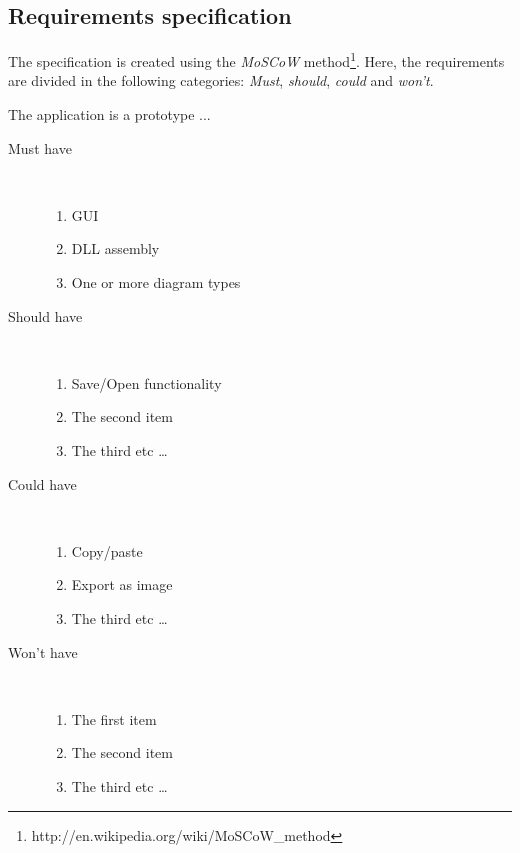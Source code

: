\newpage
\subsection{Requirements specification}
The specification is created using the \textit{MoSCoW} 
method\footnote{http://en.wikipedia.org/wiki/MoSCoW\_method}. Here, the 
requirements 
are divided in the following categories: \textit{Must}, \textit{should}, 
\textit{could} and 
\textit{won't}.

The application is a prototype ...

\begin{description}
	\item[Must have] \hfill \\
	\begin{enumerate}
		\item GUI
		\item DLL assembly
		\item One or more diagram types
	\end{enumerate}
	\item[Should have] \hfill \\
	\begin{enumerate}
		\item Save/Open functionality
		\item The second item
		\item The third etc \ldots
	\end{enumerate}
	\item[Could have] \hfill \\
	\begin{enumerate}
		\item Copy/paste
		\item Export as image
		\item The third etc \ldots
	\end{enumerate}
	\item[Won't have] \hfill \\
	\begin{enumerate}
		\item The first item
		\item The second item
		\item The third etc \ldots
	\end{enumerate}
\end{description}





